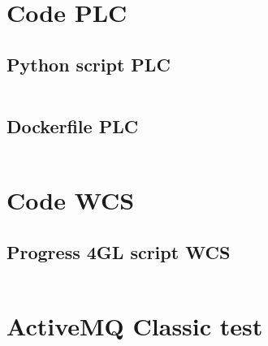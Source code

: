 
\section{Code PLC}\label{sec:codeplc}

\subsection{Python script PLC}
\inputminted{python3}{../tests/plc/plc-simulator.py}

\subsection{Dockerfile PLC}
\inputminted{python3}{../tests/plc/Dockerfile}


\section{Code WCS}\label{sec:codewcs}

\subsection{Progress 4GL script WCS}
\inputminted{python3}{../tests/wcs/wcs.p}

\section{ActiveMQ Classic test}\label{sec:codeamq}
\inputminted{python3}{../tests/messaging/activemq-server/Dockerfile}
